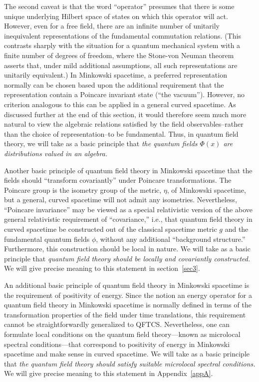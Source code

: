 \documentclass[12pt]{article}
\renewcommand{\O}{\Phi}
\theoremstyle{plain}
\theoremstyle{definition}
\begin{document}
The second caveat is that the word ``operator'' presumes that there is some unique underlying Hilbert space of states on which this operator will act. However, even for a free field, there are an infinite number of unitarily inequivalent representations of the fundamental commutation relations. (This contrasts sharply with the situation for a quantum mechanical system with a finite number of degrees of freedom, where the Stone-von Neuman theorem asserts that, under mild additional assumptions, all such representations are unitarily equivalent.) In Minkowski spacetime, a preferred representation normally can be chosen based upon the additional requirement that the representation contain a  Poincare
invariant state (``the vacuum''). However, no criterion analogous to this can be applied in a general curved spacetime. As discussed further at the end of this section, it would therefore seem much more natural to view the algebraic relations satisfied by the field observables--rather than the choice of representation--to be fundamental. Thus, in quantum field theory, we will take as a basic principle that {\em the quantum fields $\O(x)$ are distributions valued in an algebra.}

Another basic principle of quantum field theory in Minkowski spacetime that the fields should ``transform covariantly'' under Poincare transformations. The Poincare group is the isometry group of the metric, $\eta$, of Minkowski spacetime, but a general, curved spacetime will not admit any isometries. Nevertheless, ``Poincare invariance'' may be viewed as a special relativistic version of the above general relativistic requirement of ``covariance,'' i.e., that quantum field theory in curved spacetime be constructed out of the classical spacetime metric $g$ and the fundamental quantum fields $\phi$, without any additional ``background structure.'' Furthermore, this construction should be local in nature. We will take as a basic principle that {\em quantum field theory should be locally and covariantly constructed.} We will give precise meaning to this statement in section~\ref{sec3}.

An additional basic principle of quantum field theory in Minkowski spacetime is the requirement of positivity of energy. Since the notion an energy operator for a quantum field theory in Minkowski spacetime is normally defined in terms of the transformation properties of the field under time translations, this requirement cannot be straightforwardly generalized to QFTCS. Nevertheless, one can formulate local conditions on the quantum field theory---known as microlocal spectral conditions---that correspond to positivity of energy in Minkowski spacetime and make sense in curved spacetime. We will take as a basic principle that {\em the quantum field theory should satisfy suitable microlocal spectral conditions.} We will give precise meaning to this statement in Appendix~\ref{appA}.
\end{document}
